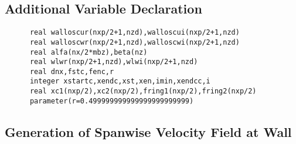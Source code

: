 \subsection*{Additional Variable Declaration}
\begin{verbatim}
      real walloscur(nxp/2+1,nzd),walloscui(nxp/2+1,nzd)
      real walloscwr(nxp/2+1,nzd),walloscwi(nxp/2+1,nzd)
      real alfa(nx/2*mbz),beta(nz)
      real wlwr(nxp/2+1,nzd),wlwi(nxp/2+1,nzd)
      real dnx,fstc,fenc,r
      integer xstartc,xendc,xst,xen,imin,xendcc,i
      real xc1(nxp/2),xc2(nxp/2),fring1(nxp/2),fring2(nxp/2)
      parameter(r=0.499999999999999999999999)
\end{verbatim}

\subsection*{Generation of Spanwise Velocity Field at Wall}
